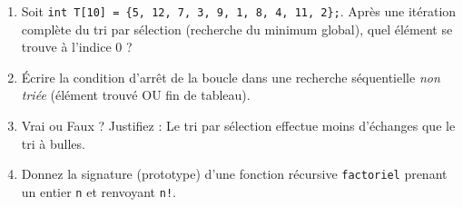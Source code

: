 \documentclass[11pt]{article}
\begin{document}
\begin{exercice}
\begin{enumerate}
    \item Soit \texttt{int T[10] = \{5, 12, 7, 3, 9, 1, 8, 4, 11, 2\};}. Après une itération complète du tri par sélection (recherche du minimum global), quel élément se trouve à l'indice 0 ?
    \item Écrire la condition d'arrêt de la boucle dans une recherche séquentielle \textit{non triée} (élément trouvé OU fin de tableau).
    \item Vrai ou Faux ? Justifiez : Le tri par sélection effectue moins d'échanges que le tri à bulles.
    \item Donnez la signature (prototype) d'une fonction récursive \texttt{factoriel} prenant un entier \texttt{n} et renvoyant \texttt{n!}.
\end{enumerate}
\end{exercice}
\end{document}
